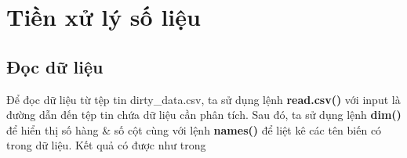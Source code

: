 \section{Tiền xử lý số liệu}
\subsection{Đọc dữ liệu}
Để đọc dữ liệu từ tệp tin dirty\_data.csv, ta sử dụng lệnh \textbf{read.csv()} với input là đường dẫn đến tệp tin chứa dữ liệu cần phân tích. Sau đó, ta sử dụng lệnh \textbf{dim()} để hiển thị số hàng \& số cột cùng với lệnh \textbf{names()} để liệt kê các tên biến có trong dữ liệu. Kết quả có được như trong 

